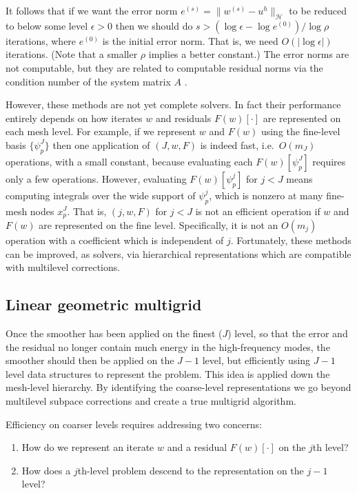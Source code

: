 \documentclass[letterpaper,final,12pt,reqno]{amsart}
\theoremstyle{claim}
\newcommand{\eps}{\epsilon}
\numberwithin{equation}{section}
\numberwithin{figure}{section}
\numberwithin{table}{section}
\numberwithin{theorem}{section}
\begin{document}
It follows that if we want the error norm $e^{(s)} = \|w^{(s)}-u^h\|_{\mathcal{H}}$ to be reduced to below some level $\eps>0$ then we should do $s>(\log\eps - \log e^{(0)})/\log \rho$ iterations, where $e^{(0)}$ is the initial error norm.  That is, we need $O(|\log\eps|)$ iterations.  (Note that a smaller $\rho$ implies a better constant.)  The error norms are not computable, but they are related to computable residual norms via the condition number of the system matrix $A$ \cite[Chapter 2]{Bueler2016}.

However, these  methods are not yet complete solvers.  In fact their performance entirely depends on how iterates $w$ and residuals $F(w)[\cdot]$ are represented on each mesh level.  For example, if we represent $w$ and $F(w)$ using the fine-level basis $\{\psi_p^J\}$ then one application of $(J,w,F)$ is indeed fast, i.e.~$O(m_J)$ operations, with a small constant, because evaluating each $F(w)[\psi_p^J]$ requires only a few operations.  However, evaluating $F(w)[\psi_p^j]$ for $j<J$ means computing integrals over the wide support of $\psi_p^j$, which is nonzero at many fine-mesh nodes $x_p^J$.  That is, $(j,w,F)$ for $j<J$ is not an efficient operation if $w$ and $F(w)$ are represented on the fine level.  Specifically, it is not an $O(m_j)$ operation with a coefficient which is independent of $j$.  Fortunately, these  methods can be improved, as solvers, via hierarchical representations which are compatible with multilevel corrections.

\subsection*{Linear geometric multigrid}  Once the smoother has been applied on the finest ($J$) level, so that the error and the residual no longer contain much energy in the high-frequency modes, the smoother should then be applied on the $J-1$ level, but efficiently using $J-1$ level data structures to represent the problem.  This idea is applied down the mesh-level hierarchy.  By identifying the coarse-level representations we go beyond multilevel subpace corrections and create a true multigrid algorithm.

Efficiency on coarser levels requires addressing two concerns:
\renewcommand{\labelenumi}{\emph{\roman{enumi})}}
\begin{enumerate}
\item How do we represent an iterate $w$ and a residual $F(w)[\cdot]$ on the $j$th level?
\item How does a $j$th-level problem descend to the representation on the $j-1$ level?
\end{enumerate}
\end{document}

